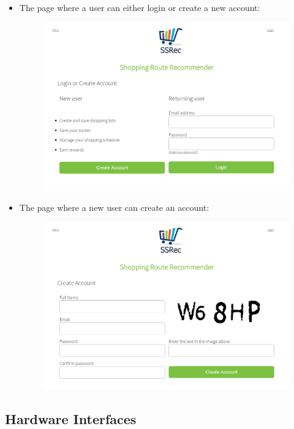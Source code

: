 \documentclass[10pt, a4paper, twocolumn]{scrartcl}
\begin{document}
\begin{itemize}
				\item The page where a user can either login or create a new account:
				\begin{figure}[h!]
					\centering
					\includegraphics[scale = 0.5]{Images/login.PNG}
					\label{menu}
				\end{figure}
				
				\vspace{-12mm}
				\item The page where a new user can create an account:
				\begin{figure}[h!]
					\centering
					\includegraphics[scale = 0.5]{Images/createAccount.PNG}
					\label{menu}
				\end{figure}
			\end{itemize}
	
		\subsection{Hardware Interfaces}
	
\end{document}

